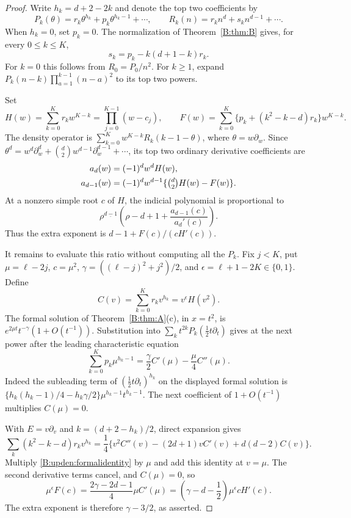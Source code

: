 \documentclass[11pt,a4paper]{article}
\theoremstyle{definition}
\theoremstyle{remark}
\numberwithin{equation}{section}
\begin{document}
\begin{proof}
Write $h_k=d+2-2k$ and denote the top two coefficients by
\[
 P_k(\theta)=r_k\theta^{h_k}+p_k\theta^{h_k-1}+\cdots,
 \qquad
 R_k(n)=r_kn^d+s_kn^{d-1}+\cdots.
\]
When $h_k=0$, set $p_k=0$.  The normalization of
Theorem~\ref{B:thm:B} gives, for every $0\le k\le K$,
\begin{equation}\label{B:upden:subleading}
 s_k=p_k-k(d+1-k)r_k.
\end{equation}
For $k=0$ this follows from $R_0=P_0/n^2$. For $k\ge1$, expand
$P_k(n-k)\prod_{a=1}^{k-1}(n-a)^2$ to its top two powers.

Set
\[
 H(w)=\sum_{k=0}^Kr_kw^{K-k}
     =\prod_{j=0}^{K-1}(w-c_j),\qquad
 F(w)=\sum_{k=0}^K\{p_k+(k^2-k-d)r_k\}w^{K-k}.
\]
The density operator is
$\sum_{k=0}^K w^{K-k}R_k(k-1-\theta)$, where
$\theta=w\partial_w$. Since
$\theta^d=w^d\partial_w^d+\binom d2w^{d-1}\partial_w^{d-1}+\cdots$,
its top two ordinary derivative coefficients are
\begin{align*}
 a_d(w)&=(-1)^dw^dH(w),\\
 a_{d-1}(w)&=(-1)^dw^{d-1}\{\tbinom d2H(w)-F(w)\}.
\end{align*}
At a nonzero simple root $c$ of $H$, the indicial polynomial is
proportional to
\[
 \rho^{\underline{d-1}}
 \left(\rho-d+1+\frac{a_{d-1}(c)}{a_d'(c)}\right).
\]
Thus the extra exponent is $d-1+F(c)/(cH'(c))$.

It remains to evaluate this ratio without computing all the $P_k$.
Fix $j<K$, put $\mu=\ell-2j$, $c=\mu^2$,
$\gamma=((\ell-j)^2+j^2)/2$, and
$\epsilon=\ell+1-2K\in\{0,1\}$.  Define
\[
 C(v)=\sum_{k=0}^Kr_kv^{h_k}=v^\epsilon H(v^2).
\]
The formal solution of Theorem~\ref{B:thm:A}(c), in $x=t^2$, is
$e^{2\mu t}t^{-\gamma}(1+O(t^{-1}))$. Substitution into
$\sum_k t^{2k}P_k(\tfrac12t\partial_t)$ gives at the next power
after the leading characteristic equation
\begin{equation}\label{B:upden:formalidentity}
 \sum_{k=0}^Kp_k\mu^{h_k-1}
      =\frac\gamma2C'(\mu)-\frac\mu4C''(\mu).
\end{equation}
Indeed the subleading term of
$(\tfrac12t\partial_t)^{h_k}$ on the displayed formal solution is
$\{h_k(h_k-1)/4-h_k\gamma/2\}\mu^{h_k-1}t^{h_k-1}$.
The next coefficient of $1+O(t^{-1})$ multiplies $C(\mu)=0$.

With $E=v\partial_v$ and $k=(d+2-h_k)/2$, direct expansion gives
\[
 \sum_k(k^2-k-d)r_kv^{h_k}
 =\frac14\{v^2C''(v)-(2d+1)vC'(v)+d(d-2)C(v)\}.
\]
Multiply \eqref{B:upden:formalidentity} by $\mu$ and add this
identity at $v=\mu$. The second derivative terms cancel, and
$C(\mu)=0$, so
\[
 \mu^\epsilon F(c)
   =\frac{2\gamma-2d-1}{4}\mu C'(\mu)
   =\left(\gamma-d-\frac12\right)\mu^\epsilon cH'(c).
\]
The extra exponent is therefore $\gamma-3/2$, as asserted.
\end{proof}
\end{document}
